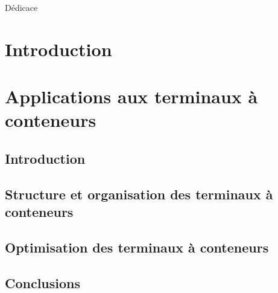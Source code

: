 \documentclass[
a4paper,
11pt,
twoside,
onecolumn,
openright,      %
leqno,          %
final   %
]{phdlasl}
\begin{document}
   	

	

	\begin{Dedicace}
	 Dédicace
	\end{Dedicace}

	

	\tableofcontents

	\chapter*{Introduction}\label{chapitre:introduction}
	
	
	\chapter{Applications aux terminaux à conteneurs}\label{chapitre:application}

	\section*{Introduction}\label{partie:application-introduction}
        

	\section{Structure et organisation des terminaux à conteneurs}\label{partie:application-terminaux}
		

	\section{Optimisation des terminaux à conteneurs}\label{partie:application-optimisationTerminaux}
	

	\section*{Conclusions}\label{partie:application-conclusions}
	
\end{document}
